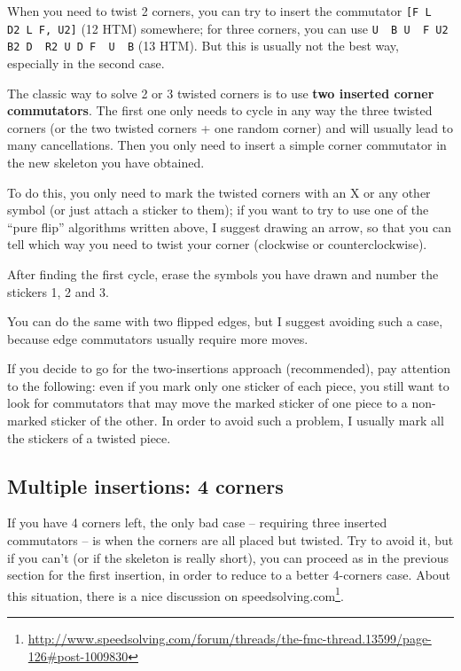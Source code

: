 \documentclass[11pt,a4paper]{book}
\newcommand{\p}{\textquotesingle}
\newcommand{\m}{\texttt}
\newcommand{\ps}{\p\,\,}
\begin{document}
When you need to twist 2 corners, you can try to insert the commutator \m{[F L\ps D2 L F\p, U2]} (12 HTM) somewhere; for three corners, you can use \m{U\ps B U\ps F U2 B2 D\ps R2 U D F\ps U\ps B} (13 HTM). But this is usually not the best way, especially in the second case.

The classic way to solve 2 or 3 twisted corners is to use \textbf{two inserted corner commutators}. The first one only needs to cycle in any way the three twisted corners (or the two twisted corners + one random corner) and will usually lead to many cancellations. Then you only need to insert a simple corner commutator in the new skeleton you have obtained.

To do this, you only need to mark the twisted corners with an X or any other symbol (or just attach a sticker to them); if you want to try to use one of the “pure flip” algorithms written above, I suggest drawing an arrow, so that you can tell which way you need to twist your corner (clockwise or counterclockwise).

After finding the first cycle, erase the symbols you have drawn and number the stickers 1, 2 and 3.

You can do the same with two flipped edges, but I suggest avoiding such a case, because edge commutators usually require more moves.

If you decide to go for the two-insertions approach (recommended), pay attention to the following: even if you mark only one sticker of each piece, you still want to look for commutators that may move the marked sticker of one piece to a non-marked sticker of the other. In order to avoid such a problem, I usually mark all the stickers of a twisted piece.

\subsection{Multiple insertions: 4 corners}

If you have 4 corners left, the only bad case -- requiring three inserted commutators -- is when the corners are all placed but twisted. Try to avoid it, but if you can't (or if the skeleton is really short), you can proceed as in the previous section for the first insertion, in order to reduce to a better 4-corners case. About this situation, there is a nice discussion on speedsolving.com\footnote{\url{http://www.speedsolving.com/forum/threads/the-fmc-thread.13599/page-126\#post-1009830}}.
\end{document}
